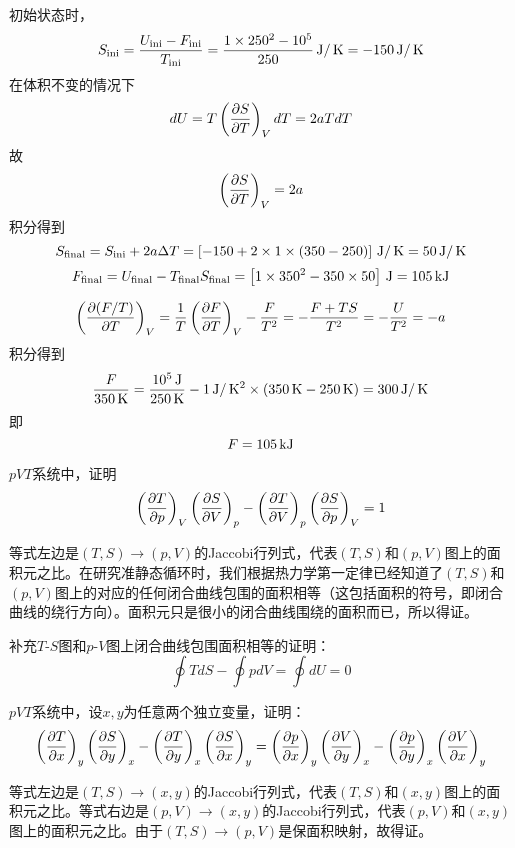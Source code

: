 \documentclass[CJK]{beamer}
\begin{document}
\begin{frame}
  \bch
  初始状态时，
  $$ S_{\rm ini} = \frac{U_{\rm ini}-F_{\rm ini}}{T_{\rm ini}} = \frac{1\times 250^2 - 10^5}{250} \,\mathrm{J}/\,\mathrm{K} = -150\,\mathrm{J}/\,\mathrm{K}$$
  在体积不变的情况下
  $$ dU = T\left(\frac{\partial S}{\partial T}\right)_{V} dT  =  2aTdT$$
  故
  $$ \left(\frac{\partial S}{\partial T}\right)_{V} = 2a $$
  积分得到
  $$ S_{\rm final}  = S_{\rm ini} + 2a\Delta T =  \left[-150 + 2\times 1\times (350-250) \right] \,\mathrm{J}/\,\mathrm{K} = 50 \,\mathrm{J}/\,\mathrm{K} $$
  $$ F_{\rm final} = U_{\rm final}-T_{\rm final}S_{\rm final} = \left[1\times 350^2 - 350\times 50\right] \,\mathrm{J} = 105\,\mathrm{kJ}$$
  
  \ech
\end{frame}

\begin{frame}
  \bch
  $$\left(\frac{\partial (F/T)}{\partial T}\right)_{V} = \frac{1}{T}\left(\frac{\partial F}{\partial T}\right)_{V} - \frac{F}{T^2} = -\frac{F+TS}{T^2} = -\frac{U}{T^2} = -a $$
  积分得到
  $$\frac{F}{350\,\mathrm{K}} = \frac{10^5\,\mathrm{J}}{250\,\mathrm{K}} - 1\,\mathrm{J}/\,\mathrm{K}^2\times(350\,\mathrm{K} - 250\,\mathrm{K}) = 300 \,\mathrm{J}/\,\mathrm{K}$$
  即
  $$F = 105 \,\mathrm{kJ}$$

  \ech
\end{frame}


\begin{frame}
  \bch
  $pVT$系统中，证明
  $$ \left(\frac{\partial T}{\partial p}\right)_{V} \left(\frac{\partial S}{\partial V}\right)_{p} - \left(\frac{\partial T}{\partial V}\right)_{p} \left(\frac{\partial S}{\partial p}\right)_{V} = 1 $$
  \ech
\end{frame}

\begin{frame}
  \bch
  等式左边是$(T,S)\rightarrow (p, V)$的Jaccobi行列式，代表$(T,S)$和$(p,V)$图上的面积元之比。在研究准静态循环时，我们根据热力学第一定律已经知道了$(T,S)$和$(p,V)$图上的对应的任何闭合曲线包围的面积相等（这包括面积的符号，即闭合曲线的绕行方向）。面积元只是很小的闭合曲线围绕的面积而已，所以得证。

  \skipline

  补充$T$-$S$图和$p$-$V$图上闭合曲线包围面积相等的证明：
$$ \oint TdS - \oint pdV = \oint dU = 0$$
  
  \ech
\end{frame}



\begin{frame}
  \bch
  $pVT$系统中，设$x, y$为任意两个独立变量，证明：
      {\small $$ \left(\frac{\partial T}{\partial x}\right)_{y} \left(\frac{\partial S}{\partial y}\right)_{x} - \left(\frac{\partial T}{\partial y}\right)_{x} \left(\frac{\partial S}{\partial x}\right)_{y} = \left(\frac{\partial p}{\partial x}\right)_{y} \left(\frac{\partial V}{\partial y}\right)_{x} - \left(\frac{\partial p}{\partial y}\right)_{x} \left(\frac{\partial V}{\partial x}\right)_{y} $$}  
  \ech
\end{frame}

\begin{frame}
  \bch
等式左边是$(T,S)\rightarrow (x, y)$的Jaccobi行列式，代表$(T,S)$和$(x,y)$图上的面积元之比。等式右边是$(p,V)\rightarrow (x, y)$的Jaccobi行列式，代表$(p,V)$和$(x,y)$图上的面积元之比。由于$(T,S)\rightarrow (p,V)$是保面积映射，故得证。
  \ech
\end{frame}
\end{document}
